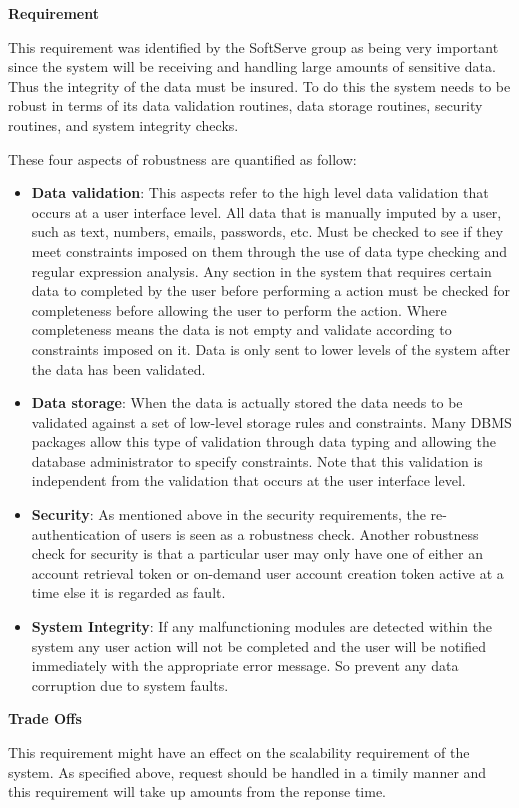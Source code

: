 \begin{flushleft}
\vspace{0.1in}

\textbf{Requirement}

This requirement was identified by the SoftServe group as being very important since the system will be receiving and handling large amounts of sensitive data. Thus the integrity of the data must be insured. To do this the system needs to be robust in terms of its data validation routines, data storage routines, security routines, and system integrity checks. 

These four aspects of robustness are quantified as follow:
\begin{itemize}
\item \textbf{Data validation}: This aspects refer to the high level data validation that occurs at a user interface level. All data that is manually imputed by a user, such as text, numbers, emails, passwords, etc. Must be checked to see if they meet constraints imposed on them through the use of data type checking and regular expression analysis. Any section in the system that requires certain data to completed by the user before performing a action must be checked for completeness before allowing the user to perform the action. Where completeness means the data is not empty and validate according to constraints imposed on it. Data is only sent to lower levels of the system after the data has been validated.
\item \textbf{Data storage}: When the data is actually stored the data needs to be validated against a set of low-level storage rules and constraints. Many DBMS packages allow this type of validation through data typing and allowing the database administrator to specify constraints. Note that this validation is independent from the validation that occurs at the user interface level.
\item \textbf{Security}: As mentioned above in the security requirements, the re-authentication of users is seen as a robustness check. Another robustness check for security is that a particular user may only have one of either an account retrieval token or on-demand user account creation token active at a time else it is regarded as fault.
\item \textbf{System Integrity}: If any malfunctioning modules are detected within the system any user action will not be completed and the user will be notified immediately with the appropriate error message. So prevent any data corruption due to system faults.
\end{itemize}
\vspace{0.1in}

\textbf{Trade Offs}

This requirement might have an effect on the scalability requirement of the system. As specified above, request should be handled in a timily manner and this requirement will take up amounts from the reponse time.
\vspace{0.1in}
\end{flushleft}
